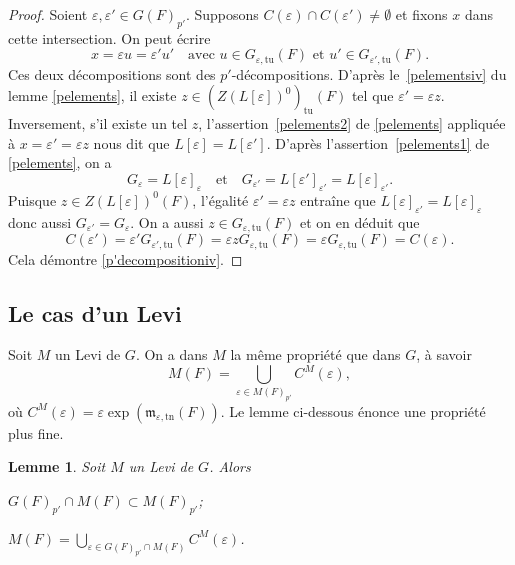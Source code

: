\documentclass[JEP,XML,SOM,Unicode,francais]{cedram}
\let\oldenumerate\enumerate
\renewcommand{\enumerate}{\oldenumerate\itemindent0pt}
\newenvironment{enumeratei}
{\bgroup\def\theenumi{\roman{enumi}}\def\theenumii{\arabic{enumii}}\oldenumerate}
{\endenumerate\egroup}
\let\epsilon\varepsilon
\newcommand{\quadet}{\quad\text{et}\quad}
\newcommand{\mfrm}{\mathfrak{m}}
\newcommand{\tn}{\mathrm{tn}}
\newcommand{\tu}{\mathrm{tu}}
\theoremstyle{plain}
\newtheorem*{lem*}{Lemme}
\theoremstyle{definition}
\begin{document}
\begin{proof}
Soient $\epsilon,\epsilon'\in G(F)_{p'}$. Supposons $C(\epsilon )\cap C(\epsilon ')\neq\emptyset$ et fixons $x$ dans cette intersection. On peut écrire
\[
x=\epsilon u=\epsilon 'u'\quad\text{avec }u\in G_{\epsilon ,\tu}(F)\text{ et } u'\in G_{\epsilon ',\tu}(F).
\]
Ces deux décompositions sont des $p'$-décompositions. D'après le~\eqref{pelementsiv} du lemme \ref{pelements}, il existe $z\in (Z(L[\epsilon ])^0)_{\tu}(F)$ tel que $\epsilon '=\epsilon z$. Inversement, s'il existe un tel $z$, l'assertion~\eqref{pelements2} de \ref{pelements} appliquée à $x=\epsilon'=\epsilon z$ nous dit que $L[\epsilon ]=L[\epsilon ']$. D'après l'assertion~\eqref{pelements1} de \ref{pelements}, on a
\[
G_{\epsilon }=L[\epsilon ]_{\epsilon }\quadet G_{\epsilon '}=L[\epsilon ']_{\epsilon '}=L[\epsilon ]_{\epsilon '}.
\]
Puisque $z\in Z(L[\epsilon ])^0(F)$, l'égalité $\epsilon '=\epsilon z$ entraîne que $L[\epsilon ]_{\epsilon '}=L[\epsilon ]_{\epsilon }$ donc aussi $G_{\epsilon '}=G_{\epsilon }$. On a aussi $z\in G_{\epsilon ,\tu}(F)$ et on en déduit que
\[
C(\epsilon ')=\epsilon 'G_{\epsilon ',\tu}(F)=\epsilon zG_{\epsilon ,\tu}(F)=\epsilon G_{\epsilon ,\tu}(F)=C(\epsilon ).
\]
Cela démontre \eqref{p'decompositioniv}.
\end{proof}

\subsection{Le cas d'un Levi}\label{lecasdunlevi}

Soit $M$ un Levi de $G$. On a dans $M$ la même propriété que dans $G$, à savoir
\[
M(F)=\bigcup_{\epsilon\in M(F)_{p'}}C^M(\epsilon),
\]
où $C^M(\epsilon)=\epsilon \exp(\mfrm_{\epsilon,\tn}(F))$. Le lemme ci-dessous énonce une propriété plus fine.

\begin{lem*}
Soit $M$ un Levi de $G$. Alors
\begin{enumeratei}
\item\label{lecasdunlevii}
$G(F)_{p'}\cap M(F)\subset M(F)_{p'}$;

\item\label{lecasdunleviii}
$M(F)=\bigcup_{\epsilon\in G(F)_{p'}\cap M(F)}C^M(\epsilon)$.
\end{enumeratei}
\end{lem*}
\end{document}
